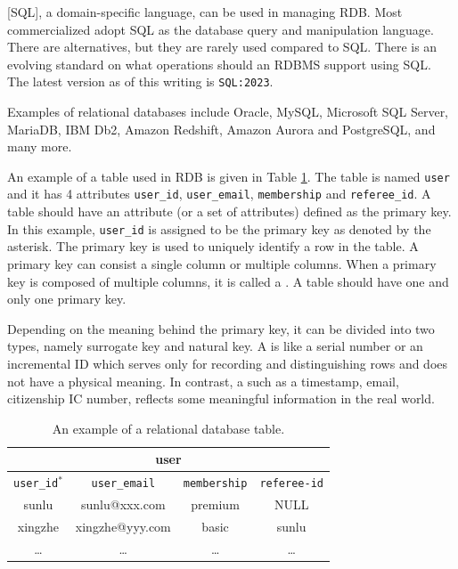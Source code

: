 [SQL], a domain-specific language, can be used in managing RDB.  Most commercialized  adopt SQL as the database query and manipulation language. There are alternatives, but they are rarely used compared to SQL. There is an evolving standard on what operations should an RDBMS support using SQL. The latest version as of this writing is \verb|SQL:2023|.

Examples of relational databases include Oracle, MySQL, Microsoft SQL Server, MariaDB, IBM Db2, Amazon Redshift, Amazon Aurora and PostgreSQL, and many more.

An example of a table used in RDB is given in Table \ref{ch:db:tab:relationaldbexample}. The table is named \verb|user| and it has 4 attributes \verb|user_id|, \verb|user_email|, \verb|membership| and \verb|referee_id|. A table should have an attribute (or a set of attributes) defined as the primary key. In this example, \verb|user_id| is assigned to be the primary key as denoted by the asterisk. The primary key is used to uniquely identify a row in the table. A primary key can consist a single column or multiple columns. When a primary key is composed of multiple columns, it is called a . A table should have one and only one primary key.

Depending on the meaning behind the primary key, it can be divided into two types, namely surrogate key and natural key. A  is like a serial number or an incremental ID which serves only for recording and distinguishing rows and does not have a physical meaning. In contrast, a  such as a timestamp, email, citizenship IC number, reflects some meaningful information in the real world.

\begin{table}
	\centering \caption{An example of a relational database table.} \label{ch:db:tab:relationaldbexample}
	\begin{tabular}{|c|c|c|c|}
		\hline
		\multicolumn{4}{|c|}{user} \\ \hline
		\verb|user_id|$^*$ & \verb|user_email| & \verb|membership| & \verb|referee-id| \\ \hline
		sunlu & sunlu@xxx.com & premium & NULL \\ \hline
		xingzhe & xingzhe@yyy.com & basic & sunlu \\ \hline
		\ldots & \ldots & \ldots & \ldots \\ \hline
	\end{tabular}
\end{table}

